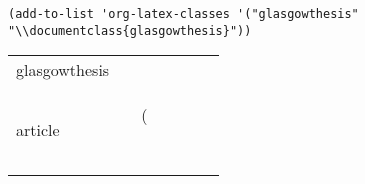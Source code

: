 \documentclass[11pt]{article}
\author{Tom PhD}
\date{\today}
\title{}
\begin{document}
\tableofcontents

\begin{verbatim}
(add-to-list 'org-latex-classes '("glasgowthesis" "\\documentclass{glasgowthesis}"))
\end{verbatim}

\begin{center}
\begin{tabular}{lllllll}
glasgowthesis & \documentclass{glasgowthesis} &  &  &  &  & \\
article & \documentclass[11pt]{article} & (\section{%
}
\end{tabular}
\end{center}
\end{document}
